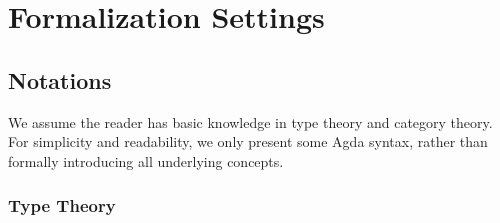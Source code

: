 \chapter{Formalization Settings}

\section{Notations}

We assume the reader has basic knowledge in type theory and category theory. For simplicity and readability, we only present some Agda syntax, rather than formally introducing all underlying concepts.

\subsection{Type Theory}

